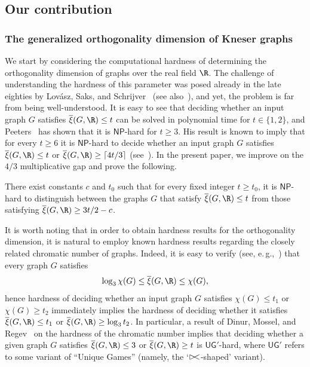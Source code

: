 \documentclass{toc}
\newcommand{\NP}{\mathsf{NP}}
\newcommand{\UG}{\mathsf{UG}}   %
\newcommand{\od}{\overline{\xi}}
\newcommand\fish{{\rhd \hskip -0.5 em <}}
\begin{document}
\subsection{Our contribution}

\subsubsection{The generalized orthogonality dimension of Kneser graphs}

We start by considering the computational hardness of determining the orthogonality dimension of graphs over the real field $\R$.
The challenge of understanding the hardness of this parameter was posed already in the late eighties by Lov\'asz, Saks, and Schrijver~\cite{LovaszSS89} (see also~\cite[Chapter~10]{LovaszBook}), and yet, the problem is far from being well-understood.
It is easy to see that deciding whether an input graph $G$ satisfies $\od(G,\R) \leq t$ can be solved in polynomial
%
%
time  %
for $t \in \{1,2\}$, and Peeters~\cite{Peeters96} has shown that it is $\NP$-hard for $t \geq 3$.
His result is known to imply that for every $t \geq 6$ it is $\NP$-hard to decide whether an input graph $G$ satisfies $\od(G,\R) \leq t$ or $\od(G,\R) \geq \lceil 4t/3 \rceil$ (see~\cite{HavivMFCS19}).
In the %
present paper,  %
we improve on the $4/3$ multiplicative gap and prove the following.
%
%
%
%
%
%
%
%
\begin{theorem}\label{thm:IntroHardness}
There exist constants $c$ and $t_0$ such that for every fixed integer $t \geq t_0$, it is $\NP$-hard to distinguish between the graphs $G$ that satisfy $\od(G,\R) \leq t$ from those satisfying $\od(G,\R) \geq 3t/2-c$.
\end{theorem}
%

It is worth noting that in order to obtain hardness results for the orthogonality dimension,
%
%
it is natural to employ known hardness results regarding the closely related chromatic number of graphs. Indeed, it is easy to verify (see, e.\,g.,~\cite{HavivMFCS19}) that every graph $G$ satisfies
\[\log_3 \chi(G) \leq \od(G,\R) \leq \chi(G),\]
hence hardness of deciding whether an input graph $G$ satisfies $\chi(G) \leq t_1$ or $\chi(G) \geq t_2$ immediately implies the hardness of deciding whether it satisfies $\od(G,\R) \leq t_1$ or $\od(G,\R) \geq \log_3 t_2$. In particular, a result of Dinur, Mossel, and Regev~\cite{DinurMR06} on the hardness of the chromatic number implies that %
%
%
%
deciding whether a given graph $G$ satisfies $\od(G,\R) \leq 3$ or $\od(G,\R) \geq t$
%
%
%
%
%
is $\UG'$-hard, where $\UG'$ refers to some variant of
``Unique Games'' (namely, the `$\fish$-shaped' variant). %
\end{document}
